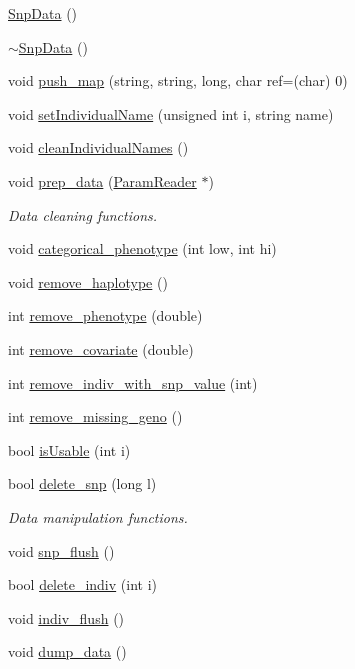 \begin{DoxyCompactItemize}
\item 
\hyperlink{classSnpData_a67ecd2aa4fd9d991117724c025d4fe8b}{SnpData} ()
\item 
\hyperlink{classSnpData_ae8f5c2288be6040daaeacf2a00a6cc5e}{$\sim$SnpData} ()
\item 
void \hyperlink{classSnpData_afde9baf5271d4ccd8a47bba6a7a3a25c}{push\_\-map} (string, string, long, char ref=(char) 0)
\item 
void \hyperlink{classSnpData_a7154ea651a58dc4d2fa5398acfa85780}{setIndividualName} (unsigned int i, string name)
\item 
void \hyperlink{classSnpData_ae6d6c89606d8176f34b11b253b40f191}{cleanIndividualNames} ()
\item 
void \hyperlink{classSnpData_a856afb537dc90f0e45c2d3a28d6a8b41}{prep\_\-data} (\hyperlink{classParamReader}{ParamReader} $\ast$)
\begin{DoxyCompactList}\small\item\em Data cleaning functions. \item\end{DoxyCompactList}\item 
void \hyperlink{classSnpData_a5f986138c94a1a0491bd56f5d0b9eb14}{categorical\_\-phenotype} (int low, int hi)
\item 
void \hyperlink{classSnpData_a6c174381b8ca1a605e7e052990b563ce}{remove\_\-haplotype} ()
\item 
int \hyperlink{classSnpData_a0056036c39385fa3e2955162755be872}{remove\_\-phenotype} (double)
\item 
int \hyperlink{classSnpData_a9fa11c7060c6eba27c09c38c8366d8d1}{remove\_\-covariate} (double)
\item 
int \hyperlink{classSnpData_ac7952b0c911c5c3f7a894ab3c5b9c179}{remove\_\-indiv\_\-with\_\-snp\_\-value} (int)
\item 
int \hyperlink{classSnpData_afadaf2a77dc7b57c53c35bfda981bbc8}{remove\_\-missing\_\-geno} ()
\item 
bool \hyperlink{classSnpData_adcde7db42d75082f1ff23379c0a52caa}{isUsable} (int i)
\item 
bool \hyperlink{classSnpData_a4aed56566f1194ab787b604563783280}{delete\_\-snp} (long l)
\begin{DoxyCompactList}\small\item\em Data manipulation functions. \item\end{DoxyCompactList}\item 
void \hyperlink{classSnpData_afc11539758009ab2d5cd4f2b04f7c1bd}{snp\_\-flush} ()
\item 
bool \hyperlink{classSnpData_af7caa689a8257f534cd6a92dac45ee82}{delete\_\-indiv} (int i)
\item 
void \hyperlink{classSnpData_ad2089f56539d02ab64282473b0ca9bd0}{indiv\_\-flush} ()
\item 
void \hyperlink{classSnpData_a55e5ee9b74b0b6057393d8e19dd8fced}{dump\_\-data} ()
\end{DoxyCompactItemize}

